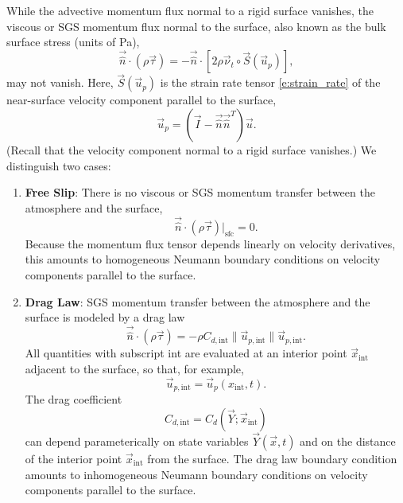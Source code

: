 \documentclass{report}
\begin{document}
While the advective momentum flux normal to a rigid surface vanishes, the viscous or SGS momentum flux normal to the surface, also known as the bulk surface stress (units of Pa), 
\[
\vec{\hat n} \cdot (\rho \vec{\tau}) = - \vec{\hat n} \cdot \left[2\rho \vec{\nu}_t \circ \vec{S}(\vec{u}_p)\right],
\]
may not vanish. Here, $\vec{S}(\vec{u}_p)$ is the strain rate tensor \eqref{e:strain_rate} of the near-surface velocity component parallel to the surface,
 \[
    \vec{u}_p = (\vec{I} - \vec{\hat n} \vec{\hat n}^T) \vec{u}.
\]
(Recall that the velocity component normal to a rigid surface vanishes.) We distinguish two cases:
\begin{enumerate}
    \item \textbf{Free Slip}: There is no viscous or SGS momentum transfer between the atmosphere and the surface,
    \[
    \vec{\hat n} \cdot (\rho \vec{\tau})\bigl|_\mathrm{sfc} = 0.
    \]
    Because the momentum flux tensor depends linearly on velocity derivatives, this amounts to homogeneous Neumann boundary conditions on velocity components parallel to the surface.
    \item \textbf{Drag Law}: SGS momentum transfer between the atmosphere and the surface is modeled by a drag law 
    \begin{equation}\label{e:drag_law}
    \vec{\hat n} \cdot (\rho \vec{\tau})  = - \rho C_{d, \mathrm{int}} \| \vec{u}_{p, \mathrm{int}} \| \vec{u}_{p, \mathrm{int}}.
    \end{equation}
    All quantities with subscript int are evaluated at an interior point $\vec{x}_\mathrm{int}$ adjacent to the surface, so that, for example,
    \[
   \vec{u}_{p, \mathrm{int}} = \vec{u}_p (x_\mathrm{int}, t).
    \]
    The drag coefficient
    \[
    C_{d, \mathrm{int}} = C_d(\vec{Y}; \vec{x}_\mathrm{int})
    \]
    can depend parameterically on state variables $\vec{Y}(\vec{x}, t)$ and on the distance of the interior point $\vec{x}_\mathrm{int}$ from the surface. The drag law boundary condition amounts to inhomogeneous Neumann boundary conditions on velocity components parallel to the surface.
\end{enumerate}
\end{document}
